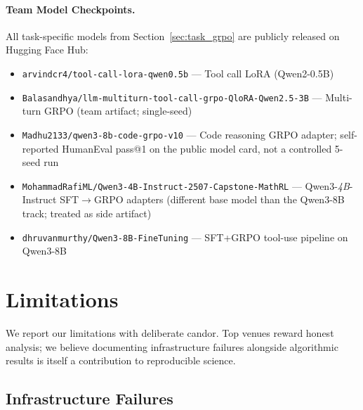 \documentclass{article}
\begin{document}
\paragraph{Team Model Checkpoints.}
All task-specific models from Section~\ref{sec:task_grpo} are publicly released
on Hugging Face Hub:
\begin{itemize}
    \item \texttt{arvindcr4/tool-call-lora-qwen0.5b} --- Tool call LoRA (Qwen2-0.5B)
    \item \texttt{Balasandhya/llm-multiturn-tool-call-grpo-QloRA-Qwen2.5-3B} --- Multi-turn GRPO (team artifact; single-seed)
    \item \texttt{Madhu2133/qwen3-8b-code-grpo-v10} --- Code reasoning GRPO adapter; self-reported HumanEval pass@1 on the public model card, not a controlled 5-seed run
    \item \texttt{MohammadRafiML/Qwen3-4B-Instruct-2507-Capstone-MathRL} --- Qwen3-\emph{4B}-Instruct SFT$\to$GRPO adapters (different base model than the Qwen3-8B track; treated as side artifact)
    \item \texttt{dhruvanmurthy/Qwen3-8B-FineTuning} --- SFT+GRPO tool-use pipeline on Qwen3-8B
\end{itemize}

\section{Limitations}
\label{sec:limitations}

We report our limitations with deliberate candor. Top venues reward honest
analysis; we believe documenting infrastructure failures alongside algorithmic
results is itself a contribution to reproducible science.

\subsection{Infrastructure Failures}
\label{sec:infra_failures}
\end{document}
